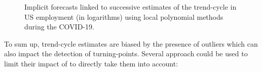 \documentclass[
]{article}
\newcommand\1{\mathds{1}}
\begin{document}
\begin{figure}[H]

\caption{\label{fig-ce16ov-previmp-covid}Implicit forecasts linked to
successive estimates of the trend-cycle in US employment (in logarithms)
using local polynomial methods during the COVID-19.}


\end{figure}%

To sum up, trend-cycle estimates are biased by the presence of outliers
which can also impact the detection of turning-points. Several approach
could be used to limit their impact of to directly take them into
account:
\end{document}
